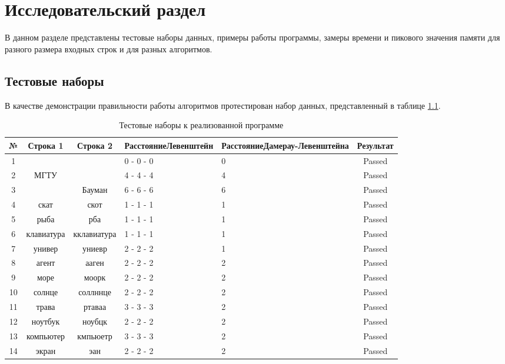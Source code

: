 \chapter{Исследовательский раздел}
В данном разделе представлены тестовые наборы данных, примеры работы программы, замеры времени и пикового значения памяти для разного размера входных строк и для разных алгоритмов.

\section{Тестовые наборы}
В качестве демонстрации правильности работы алгоритмов протестирован набор данных, представленный в таблице \ref{tests}.

\begin{table}[H]
\caption{Тестовые наборы к реализованной программе}
\label{tests}
\begin{center}
	\begin{tabular}{|c|c|c|p{3cm}|p{3cm}|c|}
		\hline
		№ & Строка 1 & Строка 2 & Расстояние\linebreak Левенштейн & Расстояние\linebreak Дамерау-\linebreak Левенштейна & Результат\\
		\hline
		1 & & & 0 - 0 - 0 & 0 & Passed \\ 
		\hline
		2 & МГТУ & & 4 - 4 - 4 & 4 & Passed \\ 
		\hline
		3 & & Бауман & 6 - 6 - 6 & 6 & Passed\\
		\hline
		4 & скат & скот & 1 - 1 - 1 & 1 & Passed\\
		\hline
		5 & рыба & рба & 1 - 1 - 1 & 1 & Passed\\
		\hline
		6 & клавиатура & кклавиатура & 1 - 1 - 1 & 1 & Passed\\
		\hline
		7 & универ & униевр & 2 - 2 - 2 & 1 & Passed\\
		\hline
		8 & агент & ааген & 2 - 2 - 2 & 2 & Passed\\
		\hline
		9 & море & моорк & 2 - 2 - 2 & 2 & Passed\\
		\hline
		10 & солнце & соллннце & 2 - 2 - 2 & 2 & Passed\\
		\hline
		11 & трава & ртаваа & 3 - 3 - 3 & 2 & Passed\\
		\hline
		12 & ноутбук & ноубцк & 2 - 2 - 2 & 2 & Passed\\
		\hline
		13 & компьютер & кмпьюетр & 3 - 3 - 3 & 2 & Passed\\
		\hline
		14 & экран & эан & 2 - 2 - 2 & 2 & Passed\\

\end{tabular}
\end{center}
\end{table}
